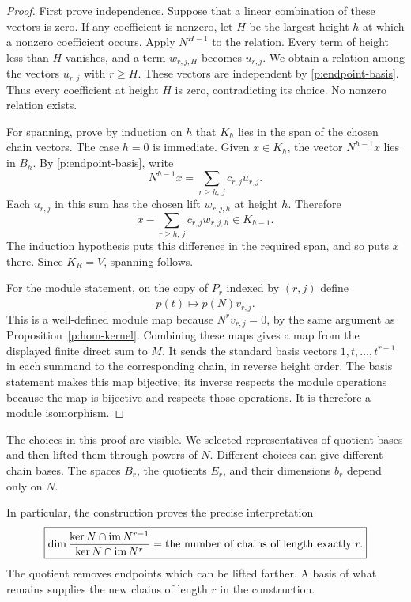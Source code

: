 \begin{proof}
First prove independence. Suppose that a linear combination of these
vectors is zero. If any coefficient is nonzero, let $H$ be the largest
height $h$ at which a nonzero coefficient occurs. Apply $N^{H-1}$ to the
relation. Every term of height less than $H$ vanishes, and a term
$w_{r,j,H}$ becomes $u_{r,j}$. We obtain a relation among the vectors
$u_{r,j}$ with $r\geq H$. These vectors are independent by
\eqref{p:endpoint-basis}. Thus every coefficient at height $H$ is zero,
contradicting its choice. No nonzero relation exists.

For spanning, prove by induction on $h$ that $K_h$ lies in the span of the
chosen chain vectors. The case $h=0$ is immediate. Given $x\in K_h$,
the vector $N^{h-1}x$ lies in $B_h$. By \eqref{p:endpoint-basis}, write
\[
 N^{h-1}x=\sum_{r\geq h,\,j}c_{r,j}u_{r,j}.
\]
Each $u_{r,j}$ in this sum has the chosen lift $w_{r,j,h}$ at height $h$.
Therefore
\[
 x-\sum_{r\geq h,\,j}c_{r,j}w_{r,j,h}\in K_{h-1}.
\]
The induction hypothesis puts this difference in the required span, and
so puts $x$ there. Since $K_R=V$, spanning follows.

For the module statement, on the copy of $P_r$ indexed by $(r,j)$ define
\[
 \overline{p(t)}\longmapsto p(N)v_{r,j}.
\]
This is a well-defined module map because $N^rv_{r,j}=0$, by the same
argument as Proposition~\ref{p:hom-kernel}. Combining these maps gives a map
from the displayed finite direct sum to $M$. It sends the standard basis
vectors $1,t,\ldots,t^{r-1}$ in each summand to the corresponding chain,
in reverse height order. The basis statement makes this map bijective;
its inverse respects the module operations because the map is bijective
and respects those operations. It is therefore a module isomorphism.
\end{proof}

The choices in this proof are visible. We selected representatives of
quotient bases and then lifted them through powers of $N$. Different
choices can give different chain bases. The spaces $B_r$, the quotients
$E_r$, and their dimensions $b_r$ depend only on $N$.

In particular, the construction proves the precise interpretation
\[
 \boxed{
 \dim\frac{\operatorname{ker} N\cap\operatorname{im} N^{r-1}}
              {\operatorname{ker} N\cap\operatorname{im} N^r}
 =\text{the number of chains of length exactly }r.
 }
\]
The quotient removes endpoints which can be lifted farther. A basis of
what remains supplies the new chains of length $r$ in the construction.

